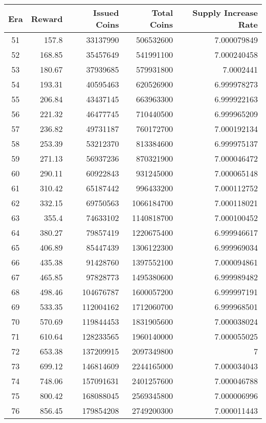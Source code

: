 \documentclass{article}      %
\begin{document}
\begin{appendix}
\begin{center}
\begin{tabular}{ |c|r|r|r|r| } 
 \hline
 Era & Reward & Issued Coins & Total Coins & Supply Increase Rate \\
 \hline
 51 & 157.8 & 33137990 & 506532600 & 7.000079849 \\
 52 & 168.85 & 35457649 & 541991100 & 7.000240458 \\
 53 & 180.67 & 37939685 & 579931800 & 7.0002441 \\
 54 & 193.31 & 40595463 & 620526900 & 6.999978273 \\
 55 & 206.84 & 43437145 & 663963300 & 6.999922163 \\
 56 & 221.32 & 46477745 & 710440500 & 6.999965209 \\
 57 & 236.82 & 49731187 & 760172700 & 7.000192134 \\
 58 & 253.39 & 53212370 & 813384600 & 6.999975137 \\
 59 & 271.13 & 56937236 & 870321900 & 7.000046472 \\
 60 & 290.11 & 60922843 & 931245000 & 7.000065148 \\
 61 & 310.42 & 65187442 & 996433200 & 7.000112752 \\
 62 & 332.15 & 69750563 & 1066184700 & 7.000118021 \\
 63 & 355.4 & 74633102 & 1140818700 & 7.000100452 \\
 64 & 380.27 & 79857419 & 1220675400 & 6.999946617 \\
 65 & 406.89 & 85447439 & 1306122300 & 6.999969034 \\
 66 & 435.38 & 91428760 & 1397552100 & 7.000094861 \\
 67 & 465.85 & 97828773 & 1495380600 & 6.999989482 \\
 68 & 498.46 & 104676787 & 1600057200 & 6.999997191 \\
 69 & 533.35 & 112004162 & 1712060700 & 6.999968501 \\
 70 & 570.69 & 119844453 & 1831905600 & 7.000038024 \\
 71 & 610.64 & 128233565 & 1960140000 & 7.000055025 \\
 72 & 653.38 & 137209915 & 2097349800 & 7 \\
 73 & 699.12 & 146814609 & 2244165000 & 7.000034043 \\
 74 & 748.06 & 157091631 & 2401257600 & 7.000046788 \\
 75 & 800.42 & 168088045 & 2569345800 & 7.000006996 \\
 76 & 856.45 & 179854208 & 2749200300 & 7.000011443 \\

\end{tabular}
\end{center}
\end{appendix}
\end{document}
